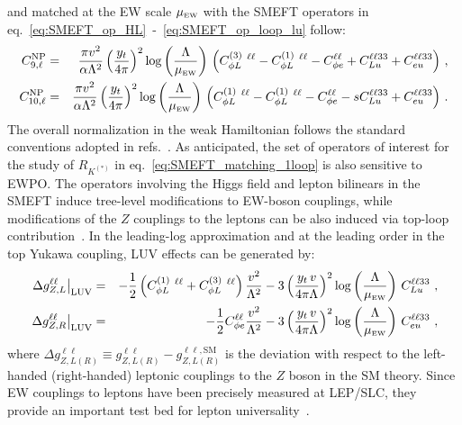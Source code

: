 and matched at the EW scale $\mu_{\textrm{\tiny{EW}}}$  with the SMEFT operators in  eq.~\eqref{eq:SMEFT_op_HL}~-~\eqref{eq:SMEFT_op_loop_lu} follow:
\begin{eqnarray} 
	\label{eq:_C9_C10}
	C_{9,\ell}^{\rm NP}&=& \frac{\pi v^{2}}{\alpha \Lambda^2} \left(\frac{y_{t} }{4 \pi}\right)^2 \log \left( \frac{\Lambda}{\mu_{\textrm{\tiny{EW}}}} \right)   \, \left(C_{\phi L}^{(3)}\ ^{\ell \ell}-C_{\phi L}^{(1)}\ ^{\ell \ell}-C^{\ell \ell}_{\phi e}+ C_{Lu}^{\ell \ell 3 3} + C_{eu}^{\ell \ell 3 3} \right)\,,\nonumber \\
	C_{10,\ell}^{\rm NP}&=& \frac{\pi v^{2}}{\alpha \Lambda^2} \left(\frac{y_{t} }{4 \pi}\right)^2 \log \left( \frac{\Lambda}{\mu_{\textrm{\tiny{EW}}}} \right)   \, \left(C_{\phi L}^{(1)}\ ^{\ell \ell}-C_{\phi L}^{(1)}\ ^{\ell \ell}-C^{\ell \ell}_{\phi e}-s C_{Lu}^{\ell \ell 3 3} + C_{eu}^{\ell \ell 3 3} \right)\, .
\end{eqnarray} 
The overall normalization in the weak Hamiltonian follows the standard conventions adopted in refs.~\cite{Ciuchini:2015qxb,Ciuchini:2017mik,Ciuchini:2019usw}.
As anticipated, the set of operators of interest for the study of $R_{K^{(*)}}$ in eq.~\eqref{eq:SMEFT_matching_1loop} is also sensitive to EWPO.  The operators involving the Higgs field and lepton bilinears in the SMEFT induce tree-level modifications to EW-boson couplings, while modifications of the $Z$ couplings to the leptons can be also induced via top-loop
 contribution~\cite{deBlas:2015aea}. In the leading-log approximation and at the leading order in the top Yukawa coupling, LUV effects can be generated by:
%
\begin{eqnarray}
	\label{eq:OLuedRGE}
	\left.\Delta g_{Z,L}^{\ell\ell}\right|_{\mathrm{LUV}} & = &
	- \frac 12 \left( C_{\phi L}^{(1)}\ ^{\ell \ell} +C_{\phi L}^{(3)}\ ^{\ell \ell} \right)\frac{v^2}{\Lambda^2}-
	3 \left( \frac{ y_t \, v}{4 \pi \Lambda} \right)^2 \log\left(\frac{\Lambda}{\mu_{\textrm{\tiny{EW}}}} \right) \, C_{Lu}^{\ell\ell33}  \ , \\ \nonumber
	\left.\Delta g_{Z,R}^{\ell\ell}\right|_{\mathrm{LUV}} & = & 
	- \frac 12 C^{\ell\ell}_{\phi e}\frac{v^2}{\Lambda^2}-
	3 \left( \frac{ y_t \, v}{4 \pi \Lambda} \right)^2 \log\left(\frac{\Lambda }{\mu_{\textrm{\tiny{EW}}}}\right) \, C_{eu}^{\ell\ell33} \ ,
\end{eqnarray}
where $\Delta g_{Z,L (R)}^{\ell\ell} \equiv g_{Z,L(R)}^{\ell\ell} - g_{Z,L (R)}^{\ell\ell,\textrm{SM}}$ is the deviation with respect to the left-handed (right-handed) leptonic couplings to the $Z$ boson in the SM theory. Since  EW couplings to leptons have been precisely measured at LEP/SLC, they provide an important test bed for lepton universality~\cite{Efrati:2015eaa,deBlas:2016ojx}.\\

